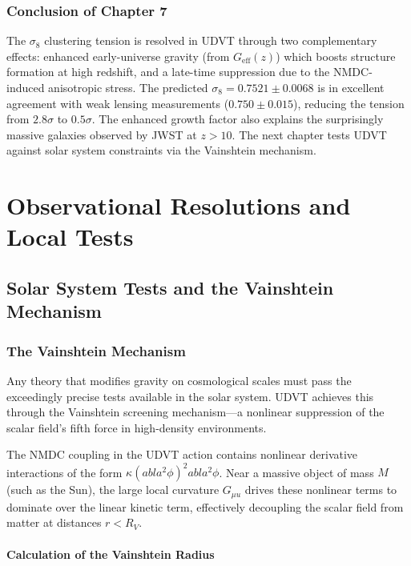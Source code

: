 \documentclass[12pt,a4paper]{book}
\theoremstyle{definition}
\theoremstyle{remark}
\begin{document}
\section{Conclusion of Chapter 7}

The $\sigma_8$ clustering tension is resolved in UDVT through two complementary effects: enhanced early-universe gravity (from $G_{\mathrm{eff}}(z)$) which boosts structure formation at high redshift, and a late-time suppression due to the NMDC-induced anisotropic stress. The predicted $\sigma_8 = 0.7521 \pm 0.0068$ is in excellent agreement with weak lensing measurements ($0.750 \pm 0.015$), reducing the tension from $2.8\sigma$ to $0.5\sigma$. The enhanced growth factor also explains the surprisingly massive galaxies observed by JWST at $z > 10$. The next chapter tests UDVT against solar system constraints via the Vainshtein mechanism.

\part{Observational Resolutions and Local Tests}

\chapter{Solar System Tests and the Vainshtein Mechanism}
\label{ch:vainshtein}

\section{The Vainshtein Mechanism}

Any theory that modifies gravity on cosmological scales must pass the exceedingly precise tests available in the solar system. UDVT achieves this through the Vainshtein screening mechanism---a nonlinear suppression of the scalar field's fifth force in high-density environments.

The NMDC coupling in the UDVT action contains nonlinear derivative interactions of the form $\kappa (
abla^2\phi)^2 
abla^2\phi$. Near a massive object of mass $M$ (such as the Sun), the large local curvature $G_{\mu
u}$ drives these nonlinear terms to dominate over the linear kinetic term, effectively decoupling the scalar field from matter at distances $r < R_V$.

\subsection{Calculation of the Vainshtein Radius}
\end{document}
